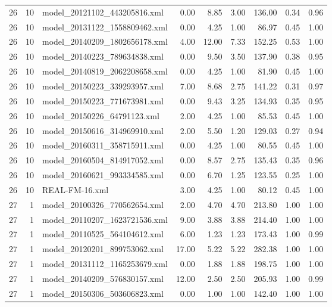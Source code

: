 \begin{table}[ht]
\begin{tabular}{rrlrrrrrr}
   26 &  10 & model\_20121102\_443205816.xml & 0.00 & 8.85 & 3.00 & 136.00 & 0.34 & 0.96 \\ 
   26 &  10 & model\_20131122\_1558809462.xml & 0.00 & 4.25 & 1.00 & 86.97 & 0.45 & 1.00 \\ 
   26 &  10 & model\_20140209\_1802656178.xml & 4.00 & 12.00 & 7.33 & 152.25 & 0.53 & 1.00 \\ 
   26 &  10 & model\_20140223\_789634838.xml & 0.00 & 9.50 & 3.50 & 137.90 & 0.38 & 0.95 \\ 
   26 &  10 & model\_20140819\_2062208658.xml & 0.00 & 4.25 & 1.00 & 81.90 & 0.45 & 1.00 \\ 
   26 &  10 & model\_20150223\_339293957.xml & 7.00 & 8.68 & 2.75 & 141.22 & 0.31 & 0.97 \\ 
   26 &  10 & model\_20150223\_771673981.xml & 0.00 & 9.43 & 3.25 & 134.93 & 0.35 & 0.95 \\ 
   26 &  10 & model\_20150226\_64791123.xml & 2.00 & 4.25 & 1.00 & 85.53 & 0.45 & 1.00 \\ 
   26 &  10 & model\_20150616\_314969910.xml & 2.00 & 5.50 & 1.20 & 129.03 & 0.27 & 0.94 \\ 
   26 &  10 & model\_20160311\_358715911.xml & 0.00 & 4.25 & 1.00 & 80.55 & 0.45 & 1.00 \\ 
   26 &  10 & model\_20160504\_814917052.xml & 0.00 & 8.57 & 2.75 & 135.43 & 0.35 & 0.96 \\ 
   26 &  10 & model\_20160621\_993334585.xml & 0.00 & 6.70 & 1.25 & 123.55 & 0.25 & 1.00 \\ 
   26 &  10 & REAL-FM-16.xml & 3.00 & 4.25 & 1.00 & 80.12 & 0.45 & 1.00 \\ 
   27 &   1 & model\_20100326\_770562654.xml & 2.00 & 4.70 & 4.70 & 213.80 & 1.00 & 1.00 \\ 
   27 &   1 & model\_20110207\_1623721536.xml & 9.00 & 3.88 & 3.88 & 214.40 & 1.00 & 1.00 \\ 
   27 &   1 & model\_20110525\_564104612.xml & 6.00 & 1.23 & 1.23 & 173.43 & 1.00 & 0.99 \\ 
   27 &   1 & model\_20120201\_899753062.xml & 17.00 & 5.22 & 5.22 & 282.38 & 1.00 & 1.00 \\ 
   27 &   1 & model\_20131112\_1165253679.xml & 0.00 & 1.88 & 1.88 & 198.75 & 1.00 & 1.00 \\ 
   27 &   1 & model\_20140209\_576830157.xml & 12.00 & 2.50 & 2.50 & 205.93 & 1.00 & 0.99 \\ 
   27 &   1 & model\_20150306\_503606823.xml & 0.00 & 1.00 & 1.00 & 142.40 & 1.00 & 1.00 \\ 

\end{tabular}
\end{table}
